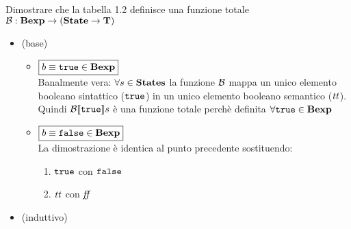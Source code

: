 {Dimostrare che la tabella 1.2 definisce una funzione totale 
$\mathcal{B}: \mbox{\textbf{Bexp}} \rightarrow (\mbox{\textbf{State}} \rightarrow \mbox{\textbf{T}})$}
{
\begin{itemize}
  \item (base)
    \begin{itemize}
      
      \item $\boxed{b \equiv \mbox{\tt true} \in \mbox{\textbf{Bexp}}}$ \\
            Banalmente vera: $\forall s \in \mbox{\textbf{States}}$ la funzione $\mathcal{B}$ mappa 
un unico elemento booleano sintattico ($\mbox{\tt true}$) in un unico elemento 
booleano semantico ($\mbox{\textit{tt}}$). Quindi $\mathcal{B} \llbracket \mbox{\tt true} \rrbracket s$ è una funzione totale 
perchè definita $\forall \mbox{\tt true} \in \mbox{\textbf{Bexp}}$
      
      \item  $\boxed{b \equiv \mbox{\tt false} \in \mbox{\textbf{Bexp}}}$ \\
            La dimostrazione è identica al punto precedente sostituendo:
            \begin{enumerate}[label=(\alph*)] 
              \item $\mbox{\tt true}$ con $\mbox{\tt false}$
              \item $\mbox{\textit{tt}}$ con $\mbox{\textit{ff}}$
            \end{enumerate} 
 
    \end{itemize}
  \item (induttivo)
\end{itemize}  
}
